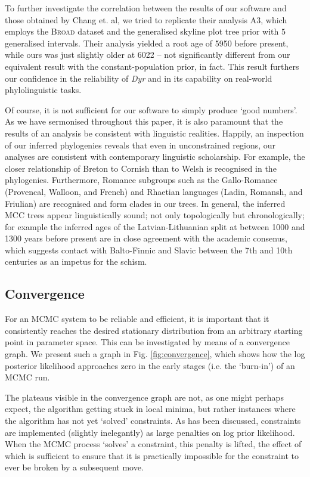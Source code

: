 \documentclass[10pt,journal,compsoc]{IEEEtran}
\begin{document}
To further investigate the correlation between the results of our software and those obtained by Chang et. al, we tried to replicate their analysis A3, which employs the \textsc{Broad} dataset and the generalised skyline plot tree prior with $5$ generalised intervals. Their analysis yielded a root age of 5950 before present, while ours was just slightly older at 6022 -- not significantly different from our equivalent result with the constant-population prior, in fact. This result furthers our confidence in the reliability of \textit{Dyr} and in its capability on real-world phylolinguistic tasks.

Of course, it is not sufficient for our software to simply produce `good numbers'. As we have sermonised throughout this paper, it is also paramount that the results of an analysis be consistent with linguistic realities. Happily, an inspection of our inferred phylogenies reveals that even in unconstrained regions, our analyses are consistent with contemporary linguistic scholarship. For example, the closer relationship of Breton to Cornish than to Welsh is recognised in the phylogenies. Furthermore, Romance subgroups such as the Gallo-Romance (Provencal, Walloon, and French) and Rhaetian languages (Ladin, Romansh, and Friulian) are recognised and form clades in our trees. In general, the inferred MCC trees appear linguistically sound; not only topologically but chronologically; for example the inferred ages of the Latvian-Lithuanian split at between 1000 and 1300 years before present are in close agreement with the academic consenus, which suggests contact with Balto-Finnic and Slavic between the 7th and 10th centuries as an impetus for the schism.\cite{baltic2018}


\subsection{Convergence}

For an MCMC system to be reliable and efficient, it is important that it consistently reaches the desired stationary distribution from an arbitrary starting point in parameter space. This can be investigated by means of a convergence graph. We present such a graph in Fig. \ref{fig:convergence}, which shows how the log posterior likelihood approaches zero in the early stages (i.e. the `burn-in') of an MCMC run.

The plateaus visible in the convergence graph are not, as one might perhaps expect, the algorithm getting stuck in local minima, but rather instances where the algorithm has not yet `solved' constraints. As has been discussed, constraints are implemented (slightly inelegantly) as large penalties on log prior likelihood. When the MCMC process `solves' a constraint, this penalty is lifted, the effect of which is sufficient to ensure that it is practically impossible for the constraint to ever be broken by a subsequent move.
\end{document}
